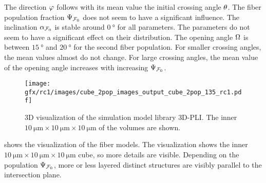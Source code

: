 \par
% 
The direction $\textnormal{$\varphi$}$ follows with its mean value the initial crossing angle $\textnormal{$\theta$}$.
The fiber population fraction $\textnormal{$\Psi_{\textnormal{$\mathcal{F}_0$}}$}$ does not seem to have a significant influence. 
The inclination $\textnormal{$\alpha_{\textnormal{$\mathcal{F}_0$}}$}$ is stable around $\SI{0}{\degree}$ for all parameters.
The parameters do not seem to have a significant effect on their distribution.
The opening angle $\textnormal{$\Omega$}$ is between $\SI{15}{\degree}$ and $\SI{20}{\degree}$ for the second fiber population.
For smaller crossing angles, the mean values almost do not change.
For large crossing angles, the mean value of the opening angle increases with increasing $\textnormal{$\Psi_{\textnormal{$\mathcal{F}_0$}}$}$.
\par
%
\begin{figure}[!t]
\centering
\texttt{[image: gfx/rc1/images/cube\_2pop\_images\_output\_cube\_2pop\_135\_rc1.pdf]}
\caption[]{3D visualization of the simulation model library \ac{3D-PLI}.
The inner $\SI{10}{\micro\meter} \times \SI{10}{\micro\meter} \times \SI{10}{\micro\meter}$ of the volumes are shown.}
\label{fig:modelImages}
\end{figure}
% 
 shows the visualization of the fiber models.
The visualization shows the inner $\SI{10}{\micro\meter} \times \SI{10}{\micro\meter} \times \SI{10}{\micro\meter}$ cube, so more details are visible.
Depending on the population $\textnormal{$\Psi_{\textnormal{$\mathcal{F}_0$}}$}$, more or less layered distinct structures are visibly parallel to the intersection plane.
\par
% 
%
% 
% 
